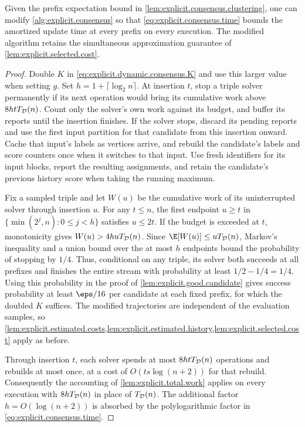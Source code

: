\begin{lemma}\label{lem:explicit.capped.work}
Given the prefix expectation bound in \cref{lem:explicit.consensus.clustering}, one can modify \cref{alg:explicit.consensus} so that \eqref{eq:explicit.consensus.time} bounds the amortized update time at every prefix on every execution.
The modified algorithm retains the simultaneous approximation guarantee of \cref{lem:explicit.selected.cost}.
\end{lemma}
\begin{proof}
Double $ K $ in \eqref{eq:explicit.dynamic.consensus.K} and use this larger value when setting $ g $.
Set $ h=1+\lceil\log_2 n\rceil $.
At insertion $ t $, stop a triple solver permanently if its next operation would bring its cumulative work above $ 8htT_{\mathcal D}(n) $.
Count only the solver's own work against its budget, and buffer its reports until the insertion finishes.
If the solver stops, discard its pending reports and use the first input partition for that candidate from this insertion onward.
Cache that input's labels as vertices arrive, and rebuild the candidate's labels and score counters once when it switches to that input.
Use fresh identifiers for its input blocks, report the resulting assignments, and retain the candidate's previous history score when taking the running maximum.

Fix a sampled triple and let $ W(u) $ be the cumulative work of its uninterrupted solver through insertion $ u $.
For any $ t\le n $, the first endpoint $ u\ge t $ in $ \{\min(2^j,n):0\le j<h\} $ satisfies $ u\le2t $.
If the budget is exceeded at $ t $, monotonicity gives $ W(u)>4huT_{\mathcal D}(n) $.
Since $ \E[W(u)]\le u\edTime{n} $, Markov's inequality and a union bound over the at most $ h $ endpoints bound the probability of stopping by $ 1/4 $.
Thus, conditional on any triple, its solver both succeeds at all prefixes and finishes the entire stream with probability at least $ 1/2-1/4=1/4 $.
Using this probability in the proof of \cref{lem:explicit.good.candidate} gives success probability at least $ \eps/16 $ per candidate at each fixed prefix, for which the doubled $ K $ suffices.
The modified trajectories are independent of the evaluation samples, so \cref{lem:explicit.estimated.costs,lem:explicit.estimated.history,lem:explicit.selected.cost} apply as before.

Through insertion $ t $, each solver spends at most $ 8htT_{\mathcal D}(n) $ operations and rebuilds at most once, at a cost of $ O(ts\log(n+2)) $ for that rebuild.
Consequently the accounting of \cref{lem:explicit.total.work} applies on every execution with $ 8hT_{\mathcal D}(n) $ in place of $ T_{\mathcal D}(n) $.
The additional factor $ h=O(\log(n+2)) $ is absorbed by the polylogarithmic factor in \eqref{eq:explicit.consensus.time}.
\end{proof}

